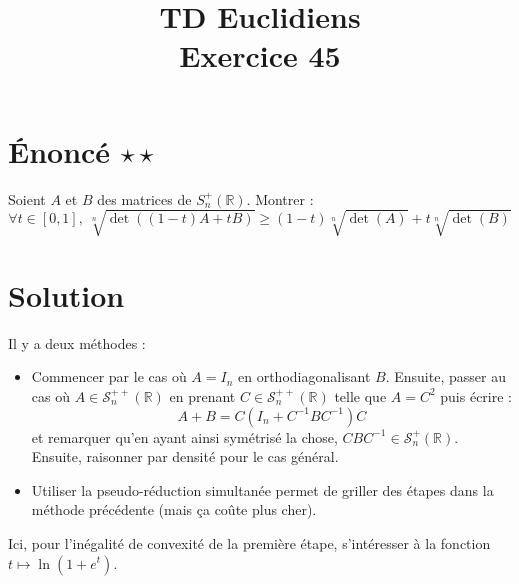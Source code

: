 \documentclass[french]{article}
\title{TD Euclidiens\\ Exercice 45}
\date{}
\newcommand{\R}{\mathbb{R}}
\newcommand{\inv}{^{-1}}
\begin{document}
\maketitle

\section{Énoncé $\star\star$}
Soient $A$ et $B$ des matrices de $S_n^+(\R)$. Montrer : $$\forall t\in[0,1],\ \sqrt[n]{\det((1-t)A+tB)}\geqslant(1-t)\sqrt[n]{\det(A)}+t\sqrt[n]{\det(B)}$$
\section{Solution}
Il y a deux méthodes :
\begin{itemize}
	\item Commencer par le cas où $A=I_n$ en orthodiagonalisant $B$. Ensuite, passer au cas où $A\in\mathcal{S}_n^{++}(\R)$ en prenant $C\in\mathcal{S}_n^{++}(\R)$ telle que $A=C^2$ puis écrire : $$A+B=C(I_n+C\inv BC\inv)C$$ et remarquer qu'en ayant ainsi symétrisé la chose, $CBC\inv\in\mathcal{S}_n^{+}(\R)$. Ensuite, raisonner par densité pour le cas général.
	\item Utiliser la pseudo-réduction simultanée permet de griller des étapes dans la méthode précédente (mais ça coûte plus cher).
\end{itemize}
Ici, pour l'inégalité de convexité de la première étape, s'intéresser à la fonction $t\mapsto \ln(1+e^t)$.
\end{document}
